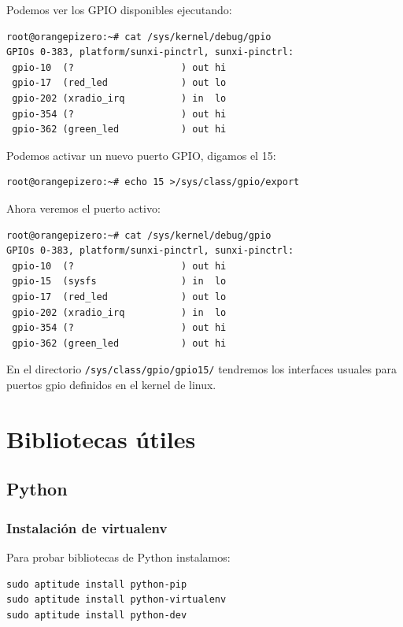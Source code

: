 \documentclass[12pt,spanish,]{scrartcl}
\begin{document}
Podemos ver los GPIO disponibles ejecutando:

\begin{verbatim}
root@orangepizero:~# cat /sys/kernel/debug/gpio
GPIOs 0-383, platform/sunxi-pinctrl, sunxi-pinctrl:
 gpio-10  (?                   ) out hi
 gpio-17  (red_led             ) out lo
 gpio-202 (xradio_irq          ) in  lo
 gpio-354 (?                   ) out hi
 gpio-362 (green_led           ) out hi
\end{verbatim}

Podemos activar un nuevo puerto GPIO, digamos el 15:

\begin{verbatim}
root@orangepizero:~# echo 15 >/sys/class/gpio/export
\end{verbatim}

Ahora veremos el puerto activo:

\begin{verbatim}
root@orangepizero:~# cat /sys/kernel/debug/gpio 
GPIOs 0-383, platform/sunxi-pinctrl, sunxi-pinctrl:
 gpio-10  (?                   ) out hi
 gpio-15  (sysfs               ) in  lo
 gpio-17  (red_led             ) out lo
 gpio-202 (xradio_irq          ) in  lo
 gpio-354 (?                   ) out hi
 gpio-362 (green_led           ) out hi
\end{verbatim}

En el directorio \texttt{/sys/class/gpio/gpio15/} tendremos los
interfaces usuales para puertos gpio definidos en el kernel de linux.

\section{Bibliotecas útiles}\label{bibliotecas-uxfatiles}

\subsection{Python}\label{python}

\subsubsection{Instalación de
virtualenv}\label{instalaciuxf3n-de-virtualenv}

Para probar bibliotecas de Python instalamos:

\begin{verbatim}
sudo aptitude install python-pip
sudo aptitude install python-virtualenv
sudo aptitude install python-dev
\end{verbatim}
\end{document}
